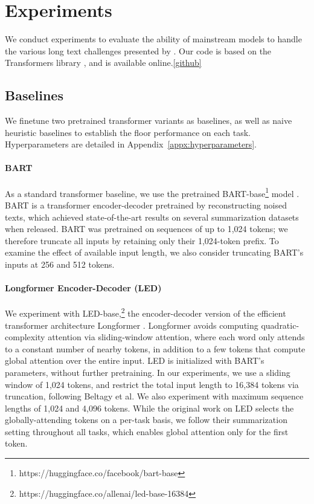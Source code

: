\section{Experiments}

We conduct experiments to evaluate the ability of mainstream models to handle the various long text challenges presented by \scrolls{}.
Our code is based on the Transformers library \cite{wolf-etal-2020-transformers}, and is available online.\ref{github}

\subsection{Baselines}

We finetune two pretrained transformer variants as baselines, as well as naive heuristic baselines to establish the floor performance on each task. Hyperparameters are detailed in Appendix~\ref{appx:hyperparameters}.

\paragraph{BART} 
As a standard transformer baseline, we use the pretrained BART-base\footnote{https://huggingface.co/facebook/bart-base} model \cite{lewis-etal-2020-bart}. BART is a transformer encoder-decoder pretrained by reconstructing noised texts, which achieved state-of-the-art results on several summarization datasets when released. BART was pretrained on sequences of up to 1,024 tokens; we therefore truncate all inputs by retaining only their 1,024-token prefix. To examine the effect of available input length, we also consider truncating BART's inputs at 256 and 512 tokens.

\paragraph{Longformer Encoder-Decoder (LED)} We experiment with LED-base,\footnote{https://huggingface.co/allenai/led-base-16384} the encoder-decoder version of the efficient transformer architecture Longformer \cite{beltagy2020longformer}. Longformer avoids computing quadratic-complexity attention via sliding-window attention, where each word only attends to a constant number of nearby tokens, in addition to a few tokens that compute global attention over the entire input. LED is initialized with BART's parameters, without further pretraining. In our experiments, we use a sliding window of 1,024 tokens, and restrict the total input length to 16,384 tokens via truncation, following Beltagy et al. We also experiment with maximum sequence lengths of 1,024 and 4,096 tokens. While the original work on LED selects the globally-attending tokens on a per-task basis, we follow their summarization setting throughout all tasks, which enables global attention only for the first token.

